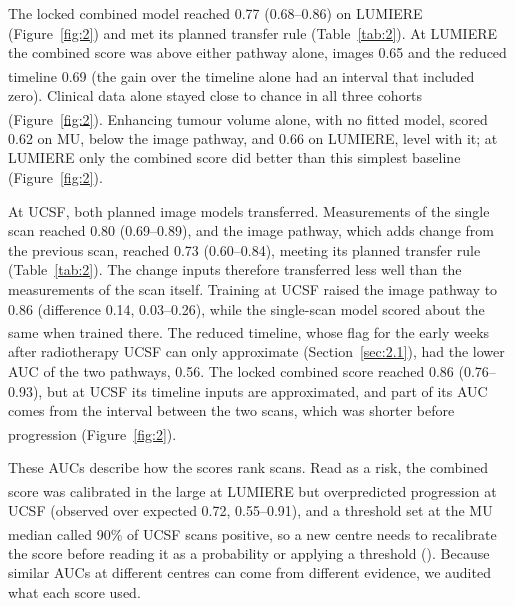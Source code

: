 \documentclass[largeformat]{interact} %
\newcommand{\expl}{\textsuperscript{\textdagger}}
\begin{document}
The locked combined model reached 0.77 (0.68--0.86) on LUMIERE (Figure~\ref{fig:2}) and met its planned transfer
rule (Table~\ref{tab:2}). At LUMIERE the combined score was above either pathway alone, images 0.65 and the reduced
timeline 0.69\expl{} (the gain over the timeline alone had an interval that included zero). Clinical data alone
stayed close to chance in all three cohorts (Figure~\ref{fig:2}). Enhancing tumour volume alone, with no fitted
model\expl, scored 0.62 on MU, below the image pathway, and 0.66 on LUMIERE, level with it; at LUMIERE only the
combined score did better than this simplest baseline (Figure~\ref{fig:2}).

At UCSF, both planned image models transferred. Measurements of the single scan reached 0.80 (0.69--0.89), and the
image pathway, which adds change from the previous scan, reached 0.73 (0.60--0.84), meeting its planned transfer rule
(Table~\ref{tab:2}). The change inputs therefore transferred less well than the measurements of the scan itself.
Training at UCSF raised the image pathway to 0.86 (difference 0.14, 0.03--0.26), while the single-scan model scored
about the same when trained there\expl. The reduced timeline, whose flag for the early weeks after radiotherapy UCSF
can only approximate (Section~\ref{sec:2.1}), had the lower AUC of the two pathways, 0.56. The locked combined score
reached 0.86 (0.76--0.93), but at UCSF its timeline inputs are approximated, and part of its AUC comes from the
interval between the two scans, which was shorter before progression\expl{} (Figure~\ref{fig:2}).

These AUCs describe how the scores rank scans. Read as a risk, the combined score was calibrated in the large at
LUMIERE\expl{} but overpredicted progression at UCSF (observed over expected 0.72, 0.55--0.91), and a
threshold set at the MU median\expl{} called 90\% of UCSF scans positive, so a new centre needs to recalibrate the score
before reading it as a probability or applying a threshold (). Because similar AUCs at different centres can come from different evidence, we audited what each score
used.
\end{document}
